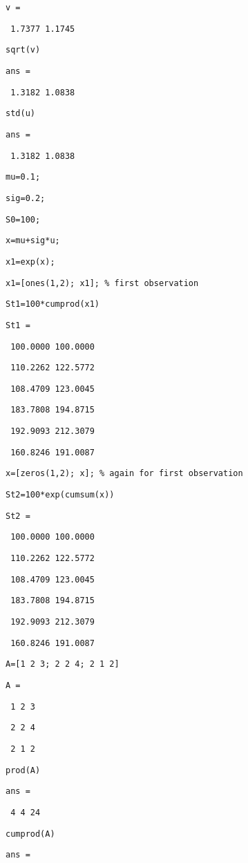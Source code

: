 \documentclass[12pt,a4paper]{article}
\begin{document}
\texttt{v =}

\texttt{\ 1.7377 1.1745}

\texttt{sqrt(v)}

\texttt{ans =}

\texttt{\ 1.3182 1.0838}

\texttt{std(u)}

\texttt{ans =}

\texttt{\ 1.3182 1.0838}

\texttt{mu=0.1;}

\texttt{sig=0.2;}

\texttt{S0=100;}

\texttt{x=mu+sig*u;}

\texttt{x1=exp(x);}

\texttt{x1=[ones(1,2); x1]; \% first observation}

\texttt{St1=100*cumprod(x1)}

\texttt{St1 =}

\texttt{\ 100.0000 100.0000}

\texttt{\ 110.2262 122.5772}

\texttt{\ 108.4709 123.0045}

\texttt{\ 183.7808 194.8715}

\texttt{\ 192.9093 212.3079}

\texttt{\ 160.8246 191.0087}

\texttt{x=[zeros(1,2); x]; \% again for first observation}

\texttt{St2=100*exp(cumsum(x))}

\texttt{St2 =}

\texttt{\ 100.0000 100.0000}

\texttt{\ 110.2262 122.5772}

\texttt{\ 108.4709 123.0045}

\texttt{\ 183.7808 194.8715}

\texttt{\ 192.9093 212.3079}

\texttt{\ 160.8246 191.0087}

\texttt{A=[1 2 3; 2 2 4; 2 1 2]}

\texttt{A =}

\texttt{\ 1 2 3}

\texttt{\ 2 2 4}

\texttt{\ 2 1 2}

\texttt{prod(A)}

\texttt{ans =}

\texttt{\ 4 4 24}

\texttt{cumprod(A)}

\texttt{ans =}
\end{document}
